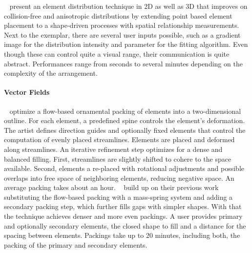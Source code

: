 

\citeauthor*{landes_2013_asm}~\cite{landes_2013_asm} present an element distribution technique in 2D as well as 3D that improves on collision-free and anisotropic distributions by extending point based element placement to a shape-driven processes with spatial relationship measurements. Next to the exemplar, there are several user inputs possible, such as a gradient image for the distribution intensity and parameter for the fitting algorithm. Even though these can control quite a visual range, their communication is quite abstract. Performances range from seconds to several minutes depending on the complexity of the arrangement. 


\paragraph*{Vector Fields}
\label{para:analysis_element_arrangements_vector}

\citeauthor*{saputra_2017_ffo}~\cite{saputra_2017_ffo} optimize a flow-based ornamental packing of elements into a two-dimensional outline. For each element, a predefined spine controls the element's deformation. The artist defines direction guides and optionally fixed elements that control the computation of evenly placed streamlines. Elements are placed and deformed along streamlines. An iterative refinement step optimizes for a dense and balanced filling. First, streamlines are slightly shifted to cohere to the space available. Second, elements a re-placed with rotational adjustments and possible overlaps into free space of neighboring elements, reducing negative space. An average packing takes about an hour. \citeauthor*{saputra_2018_rde}~\cite{saputra_2018_rde} build up on their previous work substituting the flow-based packing with a mass-spring system and adding a secondary packing step, which further fills gaps with simpler shapes. With that the technique achieves denser and more even packings. A user provides primary and optionally secondary elements, the closed shape to fill and a distance for the spacing between elements. Packings take up to 20 minutes, including both, the packing of the primary and secondary elements.



